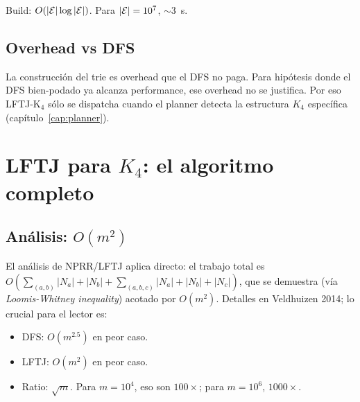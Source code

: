 \noindent
Build: \(O(|\mathcal{E}| \log |\mathcal{E}|)\). Para \(|\mathcal{E}| = 10^7\), \(\sim 3\)~s.

\subsection{Overhead vs DFS}

La construcción del trie es overhead que el DFS no paga. Para
hipótesis donde el DFS bien-podado ya alcanza performance, ese
overhead no se justifica. Por eso LFTJ-K\(_4\) sólo se dispatcha
cuando el planner detecta la estructura \(K_4\) específica
(capítulo~\ref{cap:planner}).

\section{LFTJ para \(K_4\): el algoritmo completo}

\begin{algorithm}[H]
\caption{LFTJ-K\(_4\) (versión simplificada, sin symmetry breaking)}
\end{algorithm}

\subsection{Análisis: \(O(m^2)\)}

El análisis de NPRR/LFTJ aplica directo: el trabajo total es
\(O(\sum_{(a,b)} |N_a| + |N_b| + \sum_{(a,b,c)} |N_a| + |N_b| + |N_c|)\),
que se demuestra (vía \emph{Loomis-Whitney inequality}) acotado
por \(O(m^2)\). Detalles en Veldhuizen 2014; lo crucial para el
lector es:

\begin{itemize}
    \item DFS: \(O(m^{2.5})\) en peor caso.
    \item LFTJ: \(O(m^2)\) en peor caso.
    \item Ratio: \(\sqrt{m}\). Para \(m = 10^4\), eso son
    \(100\times\); para \(m = 10^6\), \(1000\times\).
\end{itemize}

